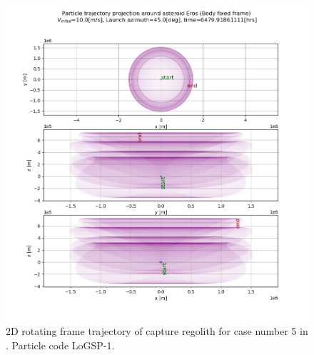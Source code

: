 \documentclass[print]{tudelft-report}
\begin{document}
\begin{appendices}
\begin{figure}[htb]
    \includegraphics[width=\textwidth, height=\textheight]{Results/Images/longest_edge_perturbations/3.2Density_1cmSize/2dTrajectory_10ms_45Azimuth_315solarPhase_bodyFrame.png}
    \caption{2D rotating frame trajectory of capture regolith for case number 5 in . Particle code LoGSP-1.}
    \label{fig:LoGSP_1_capture_case_5_2d_traj_bodyFrame}
    \end{figure}
    \FloatBarrier
    \begin{figure}[htb]
    \centering
    \captionsetup{justification=centering}

\end{figure}
\end{appendices}
\end{document}
